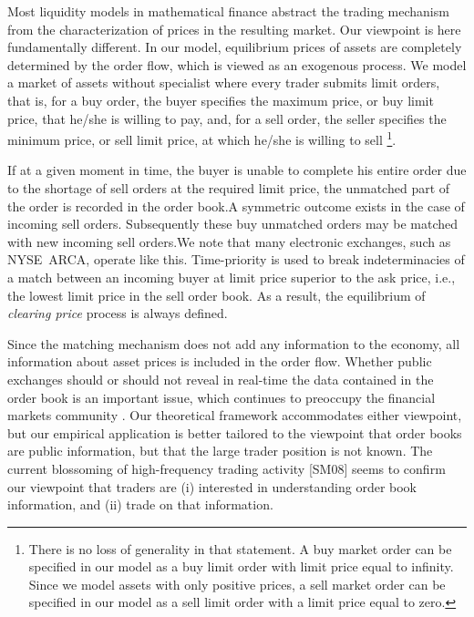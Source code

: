 \documentclass{article}
\begin{document}
Most liquidity models in mathematical finance abstract the trading mechanism
from the characterization of prices in the resulting market. Our viewpoint
is here fundamentally different. In our model, equilibrium prices of assets
are completely determined by the order flow, which is viewed as an exogenous
process. We model a market of assets without specialist where every trader
submits limit orders, that is, for a buy order, the buyer specifies the
maximum price, or buy limit price, that he/she is willing to pay, and, for a
sell order, the seller specifies the minimum price, or sell limit price, at
which he/she is willing to sell \footnote{%
There is no loss of generality in that statement. A buy market order can be
specified in our model as a buy limit order with limit price equal to
infinity. Since we model assets with only positive prices, a sell market
order can be specified in our model as a sell limit order with a limit price
equal to zero.}.

If at a given moment in time, the buyer is unable to complete his entire
order due to the shortage of sell orders at the required limit price, the
unmatched part of the order is recorded in the order book.A symmetric
outcome exists in the case of incoming sell orders. Subsequently these buy
unmatched orders may be matched with new incoming sell orders.We note that
many electronic exchanges, such as NYSE\ ARCA, operate like this.
Time-priority is used to break indeterminacies of a match between an
incoming buyer at limit price superior to the ask price, i.e., the lowest
limit price in the sell order book. As a result, the equilibrium of \textit{%
clearing price} process is always defined.

Since the matching mechanism does not add any information to the economy,
all information about asset prices is included in the order flow. Whether
public exchanges should or should not reveal in real-time the data contained
in the order book is an important issue, which continues to preoccupy the
financial markets community \cite{WW02}. Our theoretical framework
accommodates either viewpoint, but our empirical application is better
tailored to the viewpoint that order books are public information, but that
the large trader position is not known. The current blossoming of
high-frequency trading activity \cite{Eng00,BLT06, Hau08, BRZ} [SM08] seems
to confirm our viewpoint that traders are (i) interested in understanding
order book information, and (ii) trade on that information.
\end{document}
